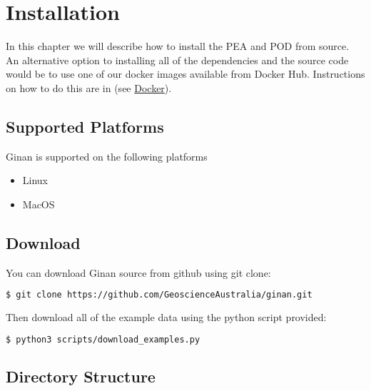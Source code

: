\chapter{Installation}
\label{ch:installation}


In this chapter we will describe how to install the PEA and POD from source. An alternative option to installing all of the dependencies and the source code would be to use one of our docker images available from Docker Hub. Instructions on how to do this are in (see \hyperref[ch:docker]{Docker}).

\section{Supported Platforms}\label{supported-platforms}

Ginan is supported on the following platforms

\begin{itemize}
\item
  Linux
\item
  MacOS\\
\end{itemize}

\section{Download}\label{download}
You can download Ginan source from github using git clone:

\begin{lstlisting}[language=bash]
$ git clone https://github.com/GeoscienceAustralia/ginan.git
\end{lstlisting}

Then download all of the example data using the python script provided:

\begin{lstlisting}[language=bash]
$ python3 scripts/download_examples.py 
\end{lstlisting}


\section{Directory Structure}\label{directory-structure}

